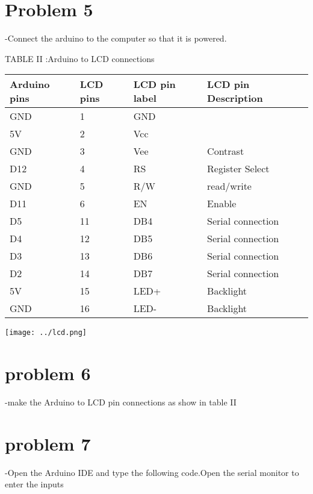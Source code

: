 \documentclass[twocolumn,13pt]{article}
\begin{document}
\section*{Problem 5}
-Connect the arduino to the computer so that it is powered.

\begin{center}
    TABLE II :Arduino to LCD connections
\end{center}
 \begin{tabular}{ |p{1.5cm}|p{1.5cm}|p{1.5cm}|p{1.5cm}| }
 \hline
 \setlength{\tabcolsep}{3pt}
Arduino pins & LCD pins & LCD pin label & LCD pin Description\\
\hline
 GND & 1& GND & \\
 \hline
 5V & 2 & Vcc &\\
 \hline
 GND & 3 & Vee & Contrast\\
 \hline
 D12 & 4 & RS & Register Select\\
 \hline
 GND & 5 & R/W & read/write\\
 \hline
 D11 & 6 & EN &Enable\\
 \hline
 D5 & 11 & DB4 & Serial connection\\
 \hline
 D4 & 12 & DB5 & Serial connection\\
 \hline
 D3 & 13 & DB6 & Serial connection\\
 \hline
 D2 & 14 & DB7 & Serial connection\\
 \hline
 5V & 15 & LED+ & Backlight\\
 \hline
 GND & 16 & LED- & Backlight\\
 \hline
\end{tabular}



 
\texttt{[image: ../lcd.png]} 


\section*{problem 6}
-make the Arduino to LCD pin connections as show in  table II
\section*{problem 7}
-Open the Arduino IDE and type the following code.Open the serial monitor to enter the inputs
\end{document}
